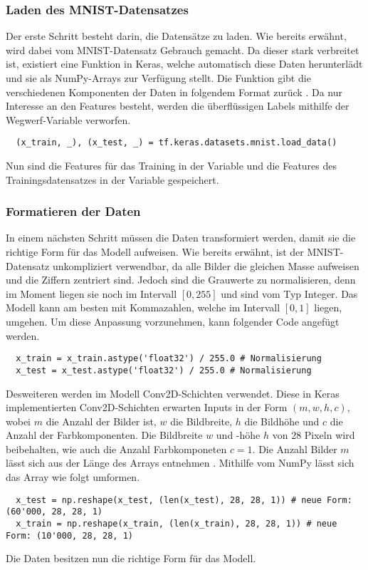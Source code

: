 \subsubsection{Laden des MNIST-Datensatzes}
Der erste Schritt besteht darin, die Datensätze zu laden. Wie bereits
erwähnt, wird dabei vom MNIST-Datensatz Gebrauch gemacht. Da dieser stark verbreitet ist,
existiert eine Funktion in Keras, welche automatisch diese Daten herunterlädt
und sie als NumPy-Arrays zur Verfügung stellt.
Die Funktion gibt die verschiedenen Komponenten der Daten in folgendem Format zurück .
Da nur Interesse an den Features  besteht, werden die überflüssigen
Labels  mithilfe der Wegwerf-Variable \code{\_} verworfen.
\begin{verbatim}
  (x_train, _), (x_test, _) = tf.keras.datasets.mnist.load_data()
\end{verbatim}
Nun sind die Features für das Training in der Variable  und die
Features des Trainingsdatensatzes in der Variable  gespeichert.

\subsubsection{Formatieren der Daten}
In einem nächsten Schritt müssen die Daten transformiert werden, damit sie die
richtige Form für das Modell aufweisen.
Wie bereits erwähnt, ist der MNIST-Datensatz unkompliziert verwendbar,
da alle Bilder die gleichen Masse aufweisen und die Ziffern zentriert sind.
\para{}
Jedoch sind die Grauwerte zu normalisieren, denn im Moment liegen sie noch im
Intervall $[0, 255]$ und sind vom Typ Integer.
Das Modell kann am besten mit Kommazahlen, welche im Intervall $[0,1]$ liegen,
umgehen. Um diese Anpassung vorzunehmen, kann folgender Code angefügt werden.
\begin{verbatim}
  x_train = x_train.astype('float32') / 255.0 # Normalisierung
  x_test = x_test.astype('float32') / 255.0 # Normalisierung
\end{verbatim}
Desweiteren werden im Modell Conv2D-Schichten verwendet. Diese in Keras
implementierten Conv2D-Schichten erwarten Inputs in der Form $(m, w, h, c)$, wobei
$m$ die Anzahl der Bilder ist, $w$ die Bildbreite, $h$ die Bildhöhe und $c$ die
Anzahl der Farbkomponenten. Die Bildbreite $w$ und -höhe $h$ von 28 Pixeln wird beibehalten, wie auch
die Anzahl Farbkomponeten $c=1$. Die Anzahl Bilder $m$ lässt sich aus der Länge
des Arrays entnehmen . Mithilfe vom NumPy lässt sich das Array wie folgt umformen.
\begin{verbatim}
  x_test = np.reshape(x_test, (len(x_test), 28, 28, 1)) # neue Form: (60'000, 28, 28, 1)
  x_train = np.reshape(x_train, (len(x_train), 28, 28, 1)) # neue Form: (10'000, 28, 28, 1)
\end{verbatim}
Die Daten besitzen nun die richtige Form für das Modell.

